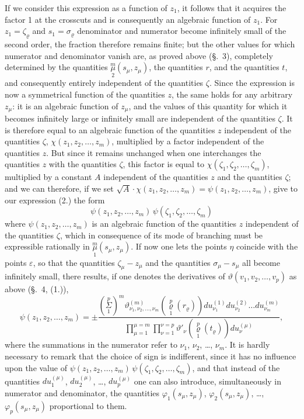 \documentclass{article}
\begin{document}
If we consider this expression as a function of $z_1$, it follows that it acquires the factor 1 at the crosscuts and is consequently an algebraic function of $z_1$. For $z_1 = \zeta_\varrho$ and $s_1 = \sigma_\varrho$ denominator and numerator become infinitely small of the second order, the fraction therefore remains finite; but the other values for which numerator and denominator vanish are, as proved above (\S.~3), completely determined by the quantities $\overset{m}{\underset{2}{\mu}}(s_\mu, z_\mu)$, the quantities $r$, and the quantities $t$, and consequently entirely independent of the quantities $\zeta$. Since the expression is now a symmetrical function of the quantities $z$, the same holds for any arbitrary $z_\mu$: it is an algebraic function of $z_\mu$, and the values of this quantity for which it becomes infinitely large or infinitely small are independent of the quantities $\zeta$. It is therefore equal to an algebraic function of the quantities $z$ independent of the quantities $\zeta$, $\chi(z_1, z_2, \dots, z_m)$, multiplied by a factor independent of the quantities $z$. But since it remains unchanged when one interchanges the quantities $z$ with the quantities $\zeta$, this factor is equal to $\chi(\zeta_1, \zeta_2, \dots, \zeta_m)$, multiplied by a constant $A$ independent of the quantities $z$ and the quantities $\zeta$; and we can therefore, if we set $\sqrt{A}\cdot\chi(z_1, z_2, \dots, z_m) = \psi(z_1, z_2, \dots, z_m)$, give to our expression (2.) the form
\[
\tag{(3.)}
\psi(z_1, z_2, \dots, z_m)\,\psi(\zeta_1, \zeta_2, \dots, \zeta_m)
\]
where $\psi(z_1, z_2, \dots, z_m)$ is an algebraic function of the quantities $z$ independent of the quantities $\zeta$, which in consequence of its mode of branching must be expressible rationally in $\overset{m}{\underset{1}{\mu}}(s_\mu, z_\mu)$. If now one lets the points $\eta$ coincide with the points $\varepsilon$, so that the quantities $\zeta_\mu - z_\mu$ and the quantities $\sigma_\mu - s_\mu$ all become infinitely small, there results, if one denotes the derivatives
of $\vartheta(v_1, v_2, \dots, v_p)$ as above (\S.~4, (1.)),
\[
\tag{(4.)}
\psi(z_1, z_2, \dots, z_m) = \pm \frac{\left(\overset{p}{\underset{1}{\Sigma}}\right)^m \vartheta^{(m)}_{\nu_1, \nu_2, \dots, \nu_m}\left(\overset{p}{\underset{1}{\varrho}}(r_\varrho)\right) du_{\nu_1}^{(1)} du_{\nu_2}^{(2)} \dots du_{\nu_m}^{(m)}}{\displaystyle\prod_{\mu=1}^{\mu=m} \prod_{\nu=1}^{\nu=p} \vartheta'_\nu\left(\overset{p}{\underset{1}{\varrho}}(t_\varrho)\right) du_\nu^{(\mu)}},
\]
where the summations in the numerator refer to $\nu_1$, $\nu_2$, \dots, $\nu_m$. It is hardly necessary to remark that the choice of sign is indifferent, since it has no influence upon the value of $\psi(z_1, z_2, \dots, z_m)\,\psi(\zeta_1, \zeta_2, \dots, \zeta_m)$, and that instead of the quantities $du_1^{(\mu)}$, $du_2^{(\mu)}$, \dots, $du_p^{(\mu)}$ one can also introduce, simultaneously in numerator and denominator, the quantities $\varphi_1(s_\mu, z_\mu)$, $\varphi_2(s_\mu, z_\mu)$, \dots, $\varphi_p(s_\mu, z_\mu)$ proportional to them.
\end{document}
